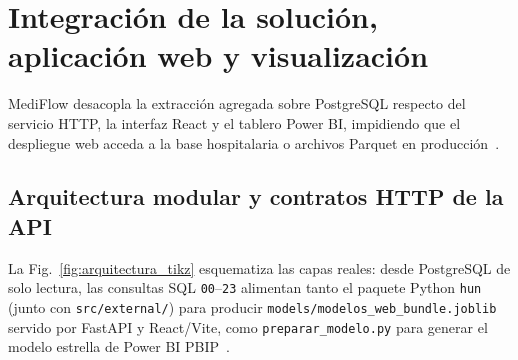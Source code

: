 
\section{Integración de la solución, aplicación web y visualización}

MediFlow desacopla la extracción agregada sobre PostgreSQL respecto del servicio HTTP, la interfaz React y el tablero Power BI, impidiendo que el despliegue web acceda a la base hospitalaria o archivos Parquet en producción~\cite{mediflow2026informe}.

\subsection{Arquitectura modular y contratos HTTP de la API}

La Fig.~\ref{fig:arquitectura_tikz} esquematiza las capas reales: desde PostgreSQL de solo lectura, las consultas SQL \texttt{00}--\texttt{23} alimentan tanto el paquete Python \texttt{hun} (junto con \texttt{src/external/}) para producir \texttt{models/modelos\_web\_bundle.joblib} servido por FastAPI y React/Vite, como \texttt{preparar\_modelo.py} para generar el modelo estrella de Power BI PBIP~\cite{mediflow2026informe,mediflow2026pbip}.

